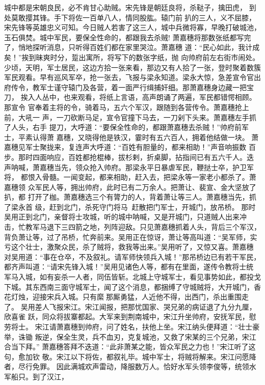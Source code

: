 城中都是宋朝良民，必不肯甘心助贼。宋先锋是朝廷良将，杀鞑子，擒田虎，
到处莫敢撄其锋。手下将佐一百单八人，情同股肱。辕门前扒的三人，义不屈膝，
宋先锋等英雄忠义可知。今日贼人若害了这三人，城中兵微将寡，早晚打破城池，
玉石俱焚。城中军民，要保全性命的，都跟我去杀贼!
萧嘉穗将那数张纸都写完了，悄地探听消息，只听得百姓们都在家里哭泣。萧嘉穗
道：“民心如此，我计成矣！”挨到昧爽时分，踅出寓所，将写下的数张字纸，抛
向帅府前左右街市闹处。
少顷，天明，军士居民，这边方拾一张来看，那边又有人拾了一张，登时聚着数簇
军民观看。早有巡风军卒，抢一张去，飞报与梁永知道。梁永大惊，急差宣令官出
府传令，教军士谨守辕门及各营，着一面严行缉捕奸细。那萧嘉穗身边藏一把宝刀，
挨入人丛中，也来观看，将纸上言语，高声朗诵了两遍，军民都错愕相顾。那宣令
官奉着主将的令，骑着马，五六个军汉，跟随到各营传令。萧嘉穗抢上前，大吼一
声，一刀砍断马足，宣令官撞下马去，一刀剁下头来。萧嘉穗左手抓了人头，右手
提刀，大呼道：“要保全性命的，都跟萧嘉穗去杀贼！”帅府前军士，平素认得萧
嘉穗，又晓得他是铁汉，霎时有五六百人，拥着他结做一块。
萧嘉穗见军士聚拢来，复连声大呼道：“百姓有胆量的，都来相助！”声音响振数
百步。那时四面响应，百姓都抢棍棒，拔杉剌，折桌脚，拈指间已有五六千人。迭
声呐喊，萧嘉穗当先，领众抢入帅府。那梁永平日暴虐军民，鞭挞士卒，护卫军将，
都恨入骨髓。一闻变起，都来相助，赶入去，把梁永等一家老小都杀了。萧嘉穗领
众军民人等，拥出帅府，此时已有二万余人。把萧让、裴宣、金大坚放了扒，都
打开了枷。萧嘉穗选三个有膂力的人，背着萧让等三人。萧嘉穗当先，抓了梁永首
级，赶到北门，杀死守门将马，赶散把门军士，开城门，放吊桥。
那时吴用正到北门，亲督将士攻城，听的城中呐喊，又是开城门，只道贼人出来冲
击，忙教军马退下三四箭之地，列阵迎敌。只见萧嘉穗抓着人头，背后三个军汉，
背负萧让等，过了吊桥，忙奔前来。吴用正在惊讶，萧让等高叫道：“吴军师，实
亏这个壮士，激聚众民，杀了贼将，救我等出来。”吴用听了，又惊又喜。萧嘉穗
对吴用道：“事在仓卒，不及叙礼。请军师快领兵入城！”那吊桥边已有若干军民，
都齐声叫道：“请宋先锋入城！”吴用见诸色人等，都有在里面，遂传令教将士统
军马入城，如有妄杀一人者，同伍皆斩。北城上守城军士，看见事势如此，都投戈
下城。其东西南三面守城军士，闻了这个消息，都捆缚了守城贼将，大开城门，香
花灯烛，迎接宋兵入城。只有縻那厮勇猛，人近他不得，出西门，杀出重围走了。
吴用差人飞报宋江。宋江闻报，把那忧国家、哭兄弟的病证退了九分九厘，欣喜雀
跃，同众将拔寨都起。大军来到荆南城中，宋江升坐帅府，安抚军民，慰劳将士。
宋江请萧嘉穗到帅府，问了姓名，扶他上坐。宋江纳头便拜道：“壮士豪举，诛锄
叛逆，保全生灵，兵不血刃，克复城池，又救了宋某的三个兄弟，宋江合当下拜。”
萧嘉穗答拜不迭道：“此非萧某之能，皆众军民之力也！”宋江听了这句，愈加钦
敬。宋江以下将佐，都叙礼毕。城中军士，将贼将解来。宋江问愿降者，尽行免罪。
因此满城欢声雷动，降服数万人。恰好水军头领李俊等，统领水军船只。到了汉江，
